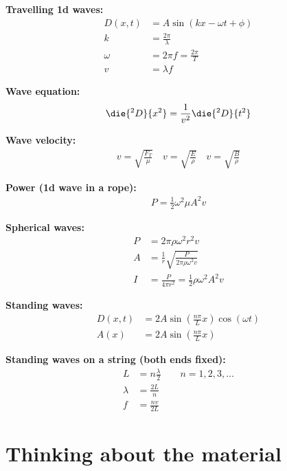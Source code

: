 \newpage
\begin{importantEquations}
\begin{multicols}{2}
\textbf{Travelling 1d waves:}
\begin{align*}
D(x,t) &= A \sin(kx-\omega t + \phi)\\
k &= \frac{2\pi}{\lambda}\\
\omega &= 2\pi f = \frac{2\pi}{T}\\
v &= \lambda f
\end{align*}

\textbf{Wave equation:}
\begin{align*}
\die{^2D}{x^2}=\frac{1}{v^2}\die{^2D}{t^2}
\end{align*}

\textbf{Wave velocity:}
\begin{align*}
v=\sqrt{\frac{F_T}{\mu}} \quad v=\sqrt{\frac{E}{\rho}} \quad v=\sqrt{\frac{B}{\rho}}
\end{align*}


\textbf{Power (1d wave in a rope):}
\begin{align*}
P = \frac{1}{2}\omega^2\mu A^2 v 
\end{align*}

\columnbreak

\textbf{Spherical waves:}
\begin{align*}
P &= 2\pi\rho\omega^2r^2 v\\
A &=\frac{1}{r}\sqrt{\frac{P}{2\pi\rho \omega^2 v}}\\
I&=\frac{P}{4\pi r^2}=\frac{1}{2}\rho\omega^2A^2v
\end{align*}

\textbf{Standing waves:}
\begin{align*}
D(x,t)&=2A\sin\left(\frac{n\pi}{L}x\right)\cos(\omega t)\\
A(x) &= 2A\sin\left(\frac{n\pi}{L}x\right)
\end{align*}

\textbf{Standing waves on a string (both ends fixed):}
\begin{align*}
L &= n\frac{\lambda}{2}\quad\quad n=1,2,3,\dots\\
\lambda &= \frac{2L}{n}\\
f &= \frac{nv}{2L}
\end{align*}
\end{multicols}
\end{importantEquations}


\newpage
\section{Thinking about the material}
